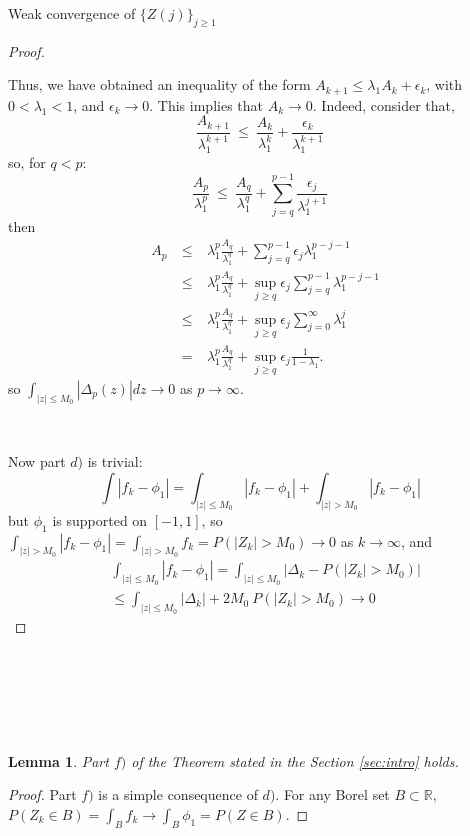 \documentclass[12pt]{article}
\newtheorem{lemma}[theorem]{Lemma}
\begin{document}
\begin{section}{Weak convergence of $\{Z(j)\}_{j \ge 1}$ }
\begin{proof}
\  

Thus, we have obtained an inequality of the form $A_{k+1} \le \lambda_1 A_k + \epsilon_k $, with $0 < \lambda_1 < 1$, and $\epsilon_k \rightarrow 0$. This implies that $A_k \rightarrow 0$. Indeed, consider that,
$$
\frac{A_{k+1}}{\lambda_1^{k+1}} ~\le~ \frac{A_{k}}{\lambda_1^{k}} + \frac{\epsilon_{k}}{\lambda_1^{k+1}}
$$
so, for $q < p$:
$$
\frac{A_p}{\lambda_1^p} ~\le~ \frac{A_q}{\lambda_1^q} + \sum_{j=q}^{p-1} \frac{\epsilon_{j}}{\lambda_1^{j+1}}
$$
then
$$
\begin{aligned}
& A_p &~\le~& \lambda_1^p \frac{A_q}{\lambda_1^q} + \sum_{j=q}^{p-1} \epsilon_j \lambda_1^{p-j-1} \\
&\  &~\le~& \lambda_1^p \frac{A_q}{\lambda_1^q} 
+ \sup_{j \ge q} \epsilon_j  \sum_{j=q}^{p-1} \lambda_1^{p-j-1} \\
&\  &~\le& \lambda_1^p \frac{A_q}{\lambda_1^q} 
+ \sup_{j \ge q} \epsilon_j  \sum_{j=0}^{\infty} \lambda_1^{j} \\
&\  &~=~& \lambda_1^p \frac{A_q}{\lambda_1^q} 
+ \sup_{j \ge q} \epsilon_j  \frac{1}{1-\lambda_1}.
\end{aligned}
$$
so $ \int_{|z| \le M_0} |\Delta_p(z)| dz \rightarrow 0$ as $p \rightarrow \infty$.  

\ 

Now part $d)$ is trivial:
$$
\int |f_k - \phi_1| = \int_{|z| \le M_0} |f_k - \phi_1|  + \int_{|z| > M_0}  |f_k - \phi_1|
$$
but $\phi_1$ is supported on $[-1,1]$, so $\int_{|z| > M_0}  |f_k - \phi_1| = \int_{|z| > M_0}  f_k = P(|Z_k| > M_0) \rightarrow 0$ as $k \rightarrow \infty$,
and
\begin{align*}
&\int_{|z| \le M_0} |f_k - \phi_1| = \int_{|z| \le M_0} |\Delta_k - P(|Z_k| > M_0)| \\
&\le \int_{|z| \le M_0} |\Delta_k|  + 2M_0\ P(|Z_k| > M_0) \rightarrow 0
\end{align*}
\end{proof}

\  

\  

\  

\begin{lemma}
	Part $f)$ of the Theorem stated in the Section \ref{sec:intro} holds.
\end{lemma}
\begin{proof}
Part $f)$ is a simple consequence of $d)$. For any Borel set $B \subset \mathbb{R}$, $P(Z_k \in B) = \int_B f_k \rightarrow  \int_B \phi_1 = P(Z \in B)$. 
\end{proof}



\end{section}
\end{document}
